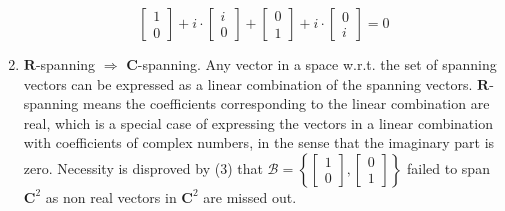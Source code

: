 \documentclass{article}
\begin{document}
\begin{enumerate}
    \[\left[\begin{array}{r}1\\0\end{array}\right]+i\cdot\left[\begin{array}{r}i\\0\end{array}\right]+\left[\begin{array}{r}0\\1\end{array}\right]+i\cdot\left[\begin{array}{r}0\\i\end{array}\right]=0\]
    \item $\mathbf{R}$-spanning $\Rightarrow$ $\mathbf{C}$-spanning. Any vector in a space w.r.t. the set of spanning vectors can be expressed as a linear combination of the spanning vectors. $\mathbf{R}$-spanning means the coefficients corresponding to the linear combination are real, which is a special case of expressing the vectors in a linear combination with coefficients of complex numbers, in the sense that the imaginary part is zero. Necessity is disproved by (3) that  $\mathcal{B}=\left\{\left[\begin{array}{r}1\\0\end{array}\right],\left[\begin{array}{r}0\\1\end{array}\right]\right\}$ failed to span $\mathbf{C}^2$ as non real vectors in $\mathbf{C}^2$ are missed out.
\end{enumerate}
\pagebreak
\end{document}
